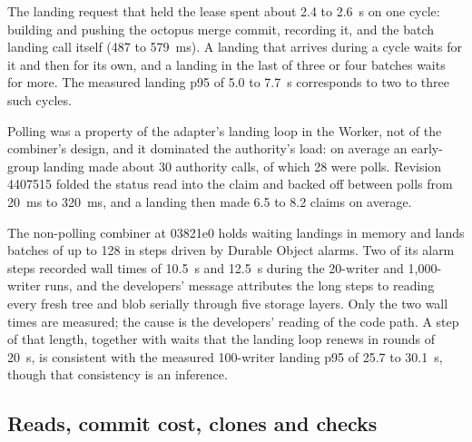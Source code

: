 \documentclass[11pt,letterpaper]{article}
\theoremstyle{definition}
\theoremstyle{remark}
\begin{document}
The landing request that held the lease spent about 2.4 to 2.6~s on one cycle: building and pushing the octopus merge commit, recording it, and the batch landing call itself (487 to 579~ms). %
A landing that arrives during a cycle waits for it and then for its own, and a landing in the last of three or four batches waits for more. The measured landing p95 of 5.0 to 7.7~s corresponds to two to three such cycles. %

Polling was a property of the adapter's landing loop in the Worker, not of the combiner's design, and it dominated the authority's load: on average an early-group landing made about 30 authority calls, of which 28 were polls. %
Revision 4407515 folded the status read into the claim and backed off between polls from 20~ms to 320~ms, and a landing then made 6.5 to 8.2 claims on average. %

The non-polling combiner at 03821e0 holds waiting landings in memory and lands batches of up to 128 in steps driven by Durable Object alarms. Two of its alarm steps recorded wall times of 10.5~s and 12.5~s during the 20-writer and 1,000-writer runs, and the developers' message attributes the long steps to reading every fresh tree and blob serially through five storage layers. %
Only the two wall times are measured; the cause is the developers' reading of the code path. A step of that length, together with waits that the landing loop renews in rounds of 20~s, is consistent with the measured 100-writer landing p95 of 25.7 to 30.1~s, though that consistency is an inference. %

\subsection{Reads, commit cost, clones and checks}
\end{document}
